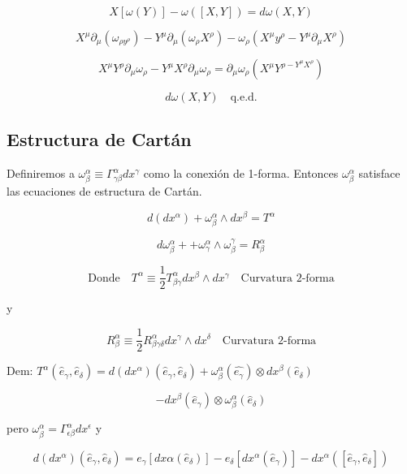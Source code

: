 \documentclass{report}
\begin{document}
{\[X[\omega (Y)] - \omega ([X,Y]) = d \omega (X,Y)\]

\[X^{\mu} \partial_{\mu} (\omega_{\rho y^{\rho}})- Y^{\mu} \partial_{\mu}(\omega_{\rho}X^{\rho}) - \omega_{\rho}(X^{\mu}y^{\rho}-Y^{\mu} \partial_{\mu}X^{\rho})\]

\[X^{\mu} Y^{\rho}\partial_{\mu}\omega_{\rho}-Y^{\mu} X^{\rho} \partial_{\mu}\omega_{\rho}= \partial_{\mu}\omega_{\rho}(X^{\mu}Y^{\rho - Y^{\mu}X^{\rho }})\]

\[d \omega (X,Y) \quad \text{q.e.d.}\]


\subsection{Estructura de Cartán}

Definiremos a $\omega_{\beta} ^{\alpha}\equiv \Gamma_{\gamma \beta}^{\alpha} dx^{\gamma}$ como la conexión de 1-forma. Entonces $\omega_{\beta} ^{\alpha}$ satisface las ecuaciones de estructura de Cartán.

\begin{equation}
d(dx^{\alpha})+ \omega_{\beta}^{\alpha} \wedge dx^{\beta} =  T^{\alpha}
\end{equation}

\begin{equation}
d \omega_{\beta} ^{\alpha} + + \omega_{\gamma}^{\alpha}\wedge \omega_{\beta}^{\gamma} = R_{\beta}^{\alpha}
\end{equation}

\[\text{Donde} \quad T^{\alpha} \equiv \frac{1}{2} T_{\beta \gamma}^{\alpha} dx^{\beta} \wedge dx^{\gamma} \quad \text{Curvatura 2-forma}\]

y

\[R_{\beta} ^{\alpha} \equiv \frac{1}{2} R^{\alpha} _{\beta \gamma \delta} dx^{\gamma} \wedge dx^{\delta} \quad \text{Curvatura 2-forma}\]

Dem: $T^{\alpha} (\hat{e}_{\gamma},\hat{e}_{\delta}) =d (dx^{\alpha})(\hat{e}_{\gamma},\hat{e}_{\delta}) + \omega_{\beta}^{\alpha} (\hat{e_{\gamma}}) \otimes dx^{\beta} (\hat{e}_{\delta})$

\[- dx^{\beta} (\hat e_{\gamma})\otimes \omega^{\alpha}_{\beta}(\hat{e}_{\delta})\]

pero $\omega_{\beta}^{\alpha} = \Gamma_{\epsilon \beta}^{\alpha} dx^{\epsilon}$ y

\[d(dx^{\alpha}) (\hat{e}_{\gamma} ,\hat{e}_{\delta})= e_{\gamma}[dx{\alpha}(\hat{e}_{\delta})] - e_{\delta} [dx^{\alpha}(\hat{e}_{\gamma})] - dx^{\alpha}([\hat{e}_{\gamma},\hat{e}_{\delta}])\]

}
\end{document}
